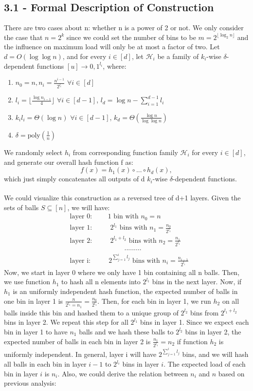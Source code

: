 \documentclass[a4paper, english]{paper}
\begin{document}
	\subsection{3.1 - Formal Description of Construction}
\quad	There are two cases about n: whether n is a power of 2 or not. We only consider the case that $n=2^k$ since we could set the number of bins to be $m = 2^{\lfloor\log_2n\rfloor}$ and the influence on maximum load will only be at most a factor of two. Let $d=O(\log\log n)$, and for every $i\in [d]$, let $\mathscr{H}_i$ be a family of $k_i$-wise $\delta$-dependent functions $[u]\rightarrow{0,1}^{l_i}$, where:
	\begin{enumerate}
		\item $n_0 = n, n_i = \frac{n^{i-1}}{2^{l_i}}$ $\forall i\in [d]$
		\item $l_i = \lfloor\frac{\log n_{i-1}}{4}\rfloor$ $\forall i\in [d-1]$, $l_d = \log n - \sum_{i=1}^{d-1}l_i$
		\item $k_il_i = \Theta(\log n)$ $\forall i\in [d-1]$, $k_d = \Theta(\frac{\log n}{\log\log n})$
		\item $\delta = \text{poly}(\frac1n)$
	\end{enumerate}
\quad	 We randomly select $h_i$ from corresponding function family $\mathscr{H}_i$ for every $i\in [d]$, and generate our overall hash function f as:
	$$f(x) = h_1(x) \circ ... \circ h_d(x),$$
	which just simply concatenates all outputs of d $k_i$-wise $\delta$-dependent functions.\\\\
\quad	We could visualize this construction as a reversed tree of d+1 layers. Given the sets of balls $S\subseteq[n]$, we will have:
	\begin{align*}
	&\text{layer 0:$\qquad$ 1 bin with }n_0 = n\\
	&\text{layer 1:$\qquad$ }2^{l_1}\text{ bins with } n_1 = \frac{n_0}{2^{l_1}}\\
	&\text{layer 2:$\qquad$ }2^{l_1+l_2}\text{ bins with }n_2 = \frac{n_1}{2^{l_1}}\\
	&\qquad\qquad\qquad\qquad.........\\
	&\text{layer i:$\qquad$ }2^{\sum_{j=1}^{i}l_j}\text{ bins with }n_i = \frac{n_{i-1}}{2^{l_i}}
	\end{align*}
\quad	Now, we start in layer 0 where we only have 1 bin containing all n balls. Then, we use function $h_1$ to hash all n elements into $2^{l_1}$ bins in the next layer. Now, if $h_1$ is an uniformly independent hash function, the expected number of balls in one bin in layer 1 is $\frac{n}{2^{l_1}=n_1}=\frac{n_0}{2^{l_1}}$. Then, for each bin in layer 1, we run $h_2$ on all balls inside this bin and hashed them to a unique group of $2^{l_2}$ bins from $2^{l_1+l_2}$ bins in layer 2. We repeat this step for all $2^{l_1}$ bins in layer 1. Since we expect each bin in layer 1 to have $n_1$ balls and we hash these balls to $2^{l_2}$ bins in layer 2, the expected number of balls in each bin in layer 2 is $\frac{n_1}{2^{l_1}}=n_2$ if function $h_2$ is uniformly independent. In general, layer i will have $2^{\sum_{j=1}^{i}l_j}$ bins, and we will hash all balls in each bin in layer $i-1$ to $2^{l_i}$ bins in layer $i$. The expected load of each bin in layer $i$ is $n_i$. Also, we could derive the relation between $n_i$ and $n$ based on previous analysis:
\end{document}
